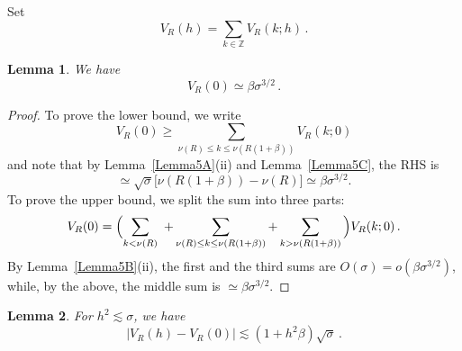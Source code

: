 \documentclass[10pt,a4paper]{amsart}
\newtheorem{lemma}{Lemma}
\newcommand{\bZ}{\mathbb Z}
\begin{document}
Set
\[
V_R(h) = \sum_{k\in\bZ} V_R(k; h)\,.
\]

\begin{lemma}\label{Lemma10a} We have
\[
V_R(0) \simeq \beta \sigma^{3/2}\,.
\]
\end{lemma}

\begin{proof}
To prove the lower bound, we write
\[
V_R(0) \ge \sum_{\nu(R)\le k \le \nu(R(1+\beta))}  V_R(k; 0)
\]
and note that by Lemma~\ref{Lemma5A}(ii) and Lemma~\ref{Lemma5C},
the RHS is
\[
\simeq \sqrt{\sigma} \bigl[ \nu(R(1+\beta)) - \nu (R) \bigr] \simeq \beta \sigma^{3/2}.
\]
To prove the upper bound, we split the sum into three parts:
\[
V_R(0) = \Bigl( \sum_{k<\nu (R)}\ + \sum_{\nu(R)\le k \le \nu(R(1+\beta))}
+ \sum_{k>\nu(R(1+\beta))}\, \Bigr) V_R(k; 0)\,.
\]
By Lemma~\ref{Lemma5B}(ii), the first and the third sums are $O(\sigma)=o(\beta\sigma^{3/2})$,
while, by the above, the middle sum is $\simeq \beta\sigma^{3/2}$.
\end{proof}

\begin{lemma}\label{Lemma10b} For $ h^2 \lesssim \sigma $, we have
\[
|V_R(h) - V_R(0)| \lesssim (1+ h^2\beta)\sqrt{\sigma}\,.
\]
\end{lemma}
\end{document}
